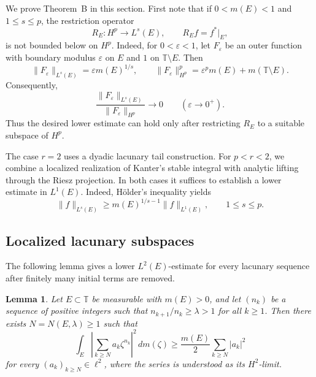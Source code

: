 \documentclass[10pt,a4paper]{amsart}
\newtheorem{lemma}[theorem]{Lemma}
\newcommand{\T}{\mathbb{T}}
\begin{document}
 
We prove Theorem~B in this section. First note that if
\(0<m(E)<1\) and \(1\le s\le p\), the restriction operator
\[
        R_E:H^p\longrightarrow L^s(E),
        \qquad
        R_Ef=f^*|_E,
\]
is not bounded below on \(H^p\). Indeed, for
\(0<\varepsilon<1\), let \(F_\varepsilon\) be an outer function with
boundary modulus \(\varepsilon\) on \(E\) and \(1\) on
\(\T\setminus E\).
Then
\[
        \|F_\varepsilon\|_{L^s(E)}
        =
        \varepsilon m(E)^{1/s},
        \qquad
        \|F_\varepsilon\|_{H^p}^p
        =
        \varepsilon^p m(E)+m(\T\setminus E).
\]
Consequently,
\[
        \frac{\|F_\varepsilon\|_{L^s(E)}}
             {\|F_\varepsilon\|_{H^p}}
        \longrightarrow0
        \qquad
        (\varepsilon\to0^+).
\]
Thus the desired lower estimate can hold only after restricting
\(R_E\) to a suitable subspace of \(H^p\).
  


The case \(r=2\) uses a dyadic lacunary tail construction. For \(p<r<2\), we combine
a localized realization of Kanter's stable integral with analytic
lifting through the Riesz projection. In both cases it suffices to
establish a lower estimate in \(L^1(E)\).  Indeed,   H\"older's inequality yields
\[
\|f\|_{L^s(E)}
\ge
m(E)^{1/s-1}\|f\|_{L^1(E)},\qquad
1\le s\le p.
\] 





\subsection{Localized lacunary subspaces}
\label{subsec:lacunary}

The following lemma gives a lower \(L^2(E)\)-estimate for every
lacunary sequence after finitely many initial terms are removed.

\begin{lemma}
\label{lem:lacunary-set}
Let \(E\subset\T\) be measurable with \(m(E)>0\), and let \((n_k)\) be
a sequence of positive integers such that
\(n_{k+1}/n_k\ge\lambda>1\) for all \(k\ge1\). Then there exists
\(N=N(E,\lambda)\ge1\) such that
\begin{equation}
\label{eq:lacunary-set}
        \int_E
        \left|
        \sum_{k\ge N}a_k\zeta^{n_k}
        \right|^2\,dm(\zeta)
        \ge
        \frac{m(E)}{2}
        \sum_{k\ge N}|a_k|^2
\end{equation}
for every \((a_k)_{k\ge N}\in\ell^2\), where the series is understood
as its \(H^2\)-limit.
\end{lemma}
\end{document}
